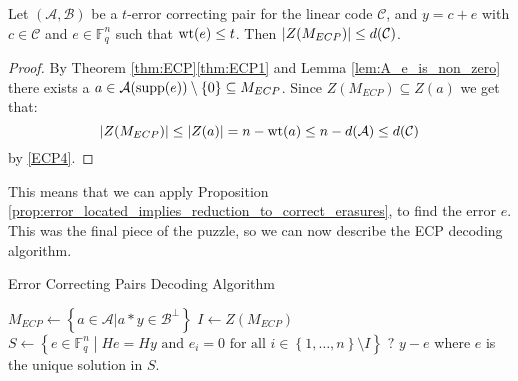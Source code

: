 \begin{lemma}\label{lem:bound_on_ZM_ECP}
  Let $(\mathcal{A}, \mathcal{B})$ be a $t$-error correcting pair for the linear code $\mathcal{C}$, and $y = c + e$ with $c \in \mathcal{C}$ and $e \in \mathbb{F}_q^n$ such that $\mathrm{wt}(e) \leq t$. Then $\left\lvert Z(M_{ECP})\right\rvert \leq d(\mathcal{C})$.
\end{lemma}
\begin{proof}
  By Theorem \ref{thm:ECP}\ref{thm:ECP1} and Lemma \ref{lem:A_e_is_non_zero} there exists a $a \in \mathcal{A}(\textnormal{supp}(e)) \setminus \left\{0\right\} \subseteq M_{ECP}$. Since $Z(M_{ECP}) \subseteq Z(a)$ we get that:
  \begin{equation*}
    \left\lvert Z(M_{ECP})\right\rvert \leq \left\lvert Z(a)\right\rvert = n - \mathrm{wt}(a) \leq n - d(\mathcal{A}) \leq d(\mathcal{C})
  \end{equation*}
  by \ref{ECP4}.
\end{proof}

This means that we can apply Proposition \ref{prop:error_located_implies_reduction_to_correct_erasures}, to find the error $e$. This was the final piece of the puzzle, so we can now describe the ECP decoding algorithm.

\begin{algorithm}[H]
\caption{Error Correcting Pairs Decoding Algorithm}\label{alg:ECP}
\begin{algorithmic}

  \State $M_{ECP} \gets \left\{a \in \mathcal{A} | a * y \in \mathcal{B}^{\perp}\right\}$
  \State $I \gets Z(M_{ECP})$
    \State $S \gets \left\{e \in \mathbb{F}_q^n \middle| He = Hy \text{ and }  e_i = 0 \text{ for all } i \in \left\{1, \ldots, n\right\} \setminus I\right\}$
      \State \Return $?$
    \Else
      \State \Return $y - e$ where $e$ is the unique solution in $S$.
    \EndIf
  \EndProcedure
\end{algorithmic}
\end{algorithm}

